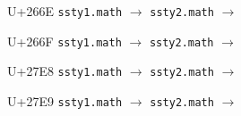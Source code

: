 \documentclass{article}
\begin{document}
\clearpage

\begin{substitutions}

U+266E  \linebreak
    \texttt{ssty1.math} $\to$  \linebreak
    \texttt{ssty2.math} $\to$  

\goodbreak

U+266F  \linebreak
    \texttt{ssty1.math} $\to$  \linebreak
    \texttt{ssty2.math} $\to$  

\goodbreak

\end{substitutions}

\clearpage

\begin{substitutions}

U+27E8  \linebreak
    \texttt{ssty1.math} $\to$  \linebreak
    \texttt{ssty2.math} $\to$  

\goodbreak

U+27E9  \linebreak
    \texttt{ssty1.math} $\to$  \linebreak
    \texttt{ssty2.math} $\to$  

\goodbreak

\end{substitutions}

\clearpage
\end{document}
